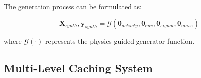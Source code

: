 \documentclass[journal]{IEEEtran}
\begin{document}

The generation process can be formulated as:

\begin{equation}
\mathbf{X}_{synth}, \mathbf{y}_{synth} = \mathcal{G}(\boldsymbol{\theta}_{activity}, \boldsymbol{\theta}_{env}, \boldsymbol{\theta}_{signal}, \boldsymbol{\theta}_{noise})
\end{equation}

where $\mathcal{G}(\cdot)$ represents the physics-guided generator function.

\subsection{Multi-Level Caching System}
\end{document}
